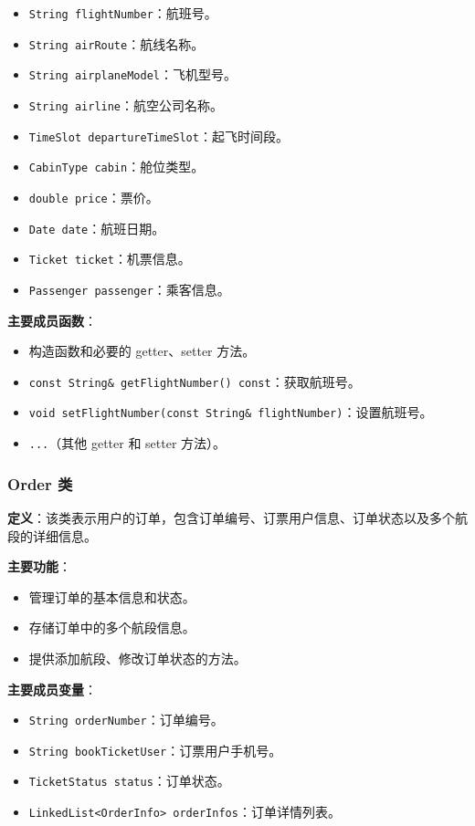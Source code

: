 \documentclass[UTF8, a4paper,12pt]{ctexart}
\begin{document}
\begin{itemize}
    \item \texttt{String flightNumber}：航班号。
    \item \texttt{String airRoute}：航线名称。
    \item \texttt{String airplaneModel}：飞机型号。
    \item \texttt{String airline}：航空公司名称。
    \item \texttt{TimeSlot departureTimeSlot}：起飞时间段。
    \item \texttt{CabinType cabin}：舱位类型。
    \item \texttt{double price}：票价。
    \item \texttt{Date date}：航班日期。
    \item \texttt{Ticket ticket}：机票信息。
    \item \texttt{Passenger passenger}：乘客信息。
\end{itemize}

\textbf{主要成员函数}：

\begin{itemize}
    \item 构造函数和必要的 getter、setter 方法。
    \item \texttt{const String\& getFlightNumber() const}：获取航班号。
    \item \texttt{void setFlightNumber(const String\& flightNumber)}：设置航班号。
    \item \texttt{...}（其他 getter 和 setter 方法）。
\end{itemize}

\subsubsection{Order 类}

\textbf{定义}：该类表示用户的订单，包含订单编号、订票用户信息、订单状态以及多个航段的详细信息。

\textbf{主要功能}：

\begin{itemize}
    \item 管理订单的基本信息和状态。
    \item 存储订单中的多个航段信息。
    \item 提供添加航段、修改订单状态的方法。
\end{itemize}

\textbf{主要成员变量}：

\begin{itemize}
    \item \texttt{String orderNumber}：订单编号。
    \item \texttt{String bookTicketUser}：订票用户手机号。
    \item \texttt{TicketStatus status}：订单状态。
    \item \texttt{LinkedList<OrderInfo> orderInfos}：订单详情列表。
\end{itemize}
\end{document}

